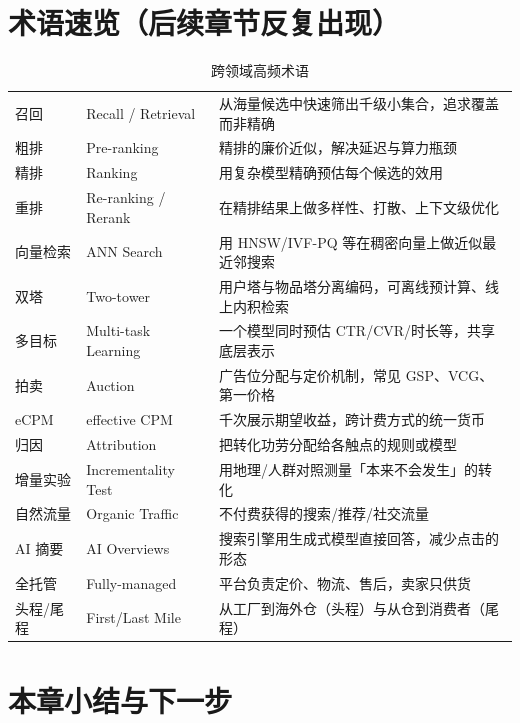 \section{术语速览（后续章节反复出现）}

\begin{table}[htbp]
\centering
\caption{跨领域高频术语}
\label{tab:terms-overview}
\small
\begin{tabularx}{\textwidth}{L{3.4cm} L{2.9cm} Y}
\toprule
{} &  &  \\
\midrule
召回 & Recall / Retrieval & 从海量候选中快速筛出千级小集合，追求覆盖而非精确 \\
粗排 & Pre-ranking & 精排的廉价近似，解决延迟与算力瓶颈 \\
精排 & Ranking & 用复杂模型精确预估每个候选的效用 \\
重排 & Re-ranking / Rerank & 在精排结果上做多样性、打散、上下文级优化 \\
向量检索 & ANN Search & 用 HNSW/IVF-PQ 等在稠密向量上做近似最近邻搜索 \\
双塔 & Two-tower & 用户塔与物品塔分离编码，可离线预计算、线上内积检索 \\
多目标 & Multi-task Learning & 一个模型同时预估 CTR/CVR/时长等，共享底层表示 \\
拍卖 & Auction & 广告位分配与定价机制，常见 GSP、VCG、第一价格 \\
eCPM & effective CPM & 千次展示期望收益，跨计费方式的统一货币 \\
归因 & Attribution & 把转化功劳分配给各触点的规则或模型 \\
增量实验 & Incrementality Test & 用地理/人群对照测量「本来不会发生」的转化 \\
自然流量 & Organic Traffic & 不付费获得的搜索/推荐/社交流量 \\
AI 摘要 & AI Overviews & 搜索引擎用生成式模型直接回答，减少点击的形态 \\
全托管 & Fully-managed & 平台负责定价、物流、售后，卖家只供货 \\
头程/尾程 & First/Last Mile & 从工厂到海外仓（头程）与从仓到消费者（尾程） \\
\bottomrule
\end{tabularx}
\end{table}

\section{本章小结与下一步}

